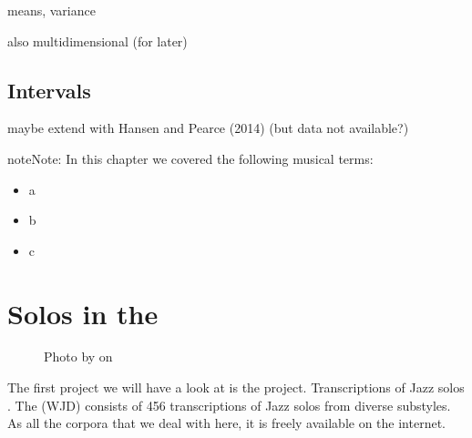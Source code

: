 \documentclass[letterpaper,10pt,english]{sphinxmanual}
\begin{document}
means, variance

also multidimensional (for later)


\section{Intervals}
\label{\detokenize{3_folk_songs:intervals}}

maybe extend with Hansen and Pearce (2014) (but data not available?)

\begin{sphinxadmonition}{note}{Note:}
In this chapter we covered the following musical terms:
\begin{itemize}
\item {} 
a

\item {} 
b

\item {} 
c

\end{itemize}
\end{sphinxadmonition}


\chapter{Solos in the }
\label{\detokenize{4_jazz_solos:solos-in-the-weimar-jazz-database}}\label{\detokenize{4_jazz_solos::doc}}
\begin{figure}[htbp]
\centering
\capstart

\noindent{}
\caption{Photo by 
on }\label{\detokenize{4_jazz_solos:id3}}\end{figure}

The first project we will have a look at is the  project.
Transcriptions of Jazz solos . The  (WJD) consists of
456 transcriptions of Jazz solos from diverse substyles.
As all the corpora that we deal with here, it is freely available on the internet. %
\begin{footnote}[1]\sphinxAtStartFootnote
{}
%
\end{footnote}
\end{document}
